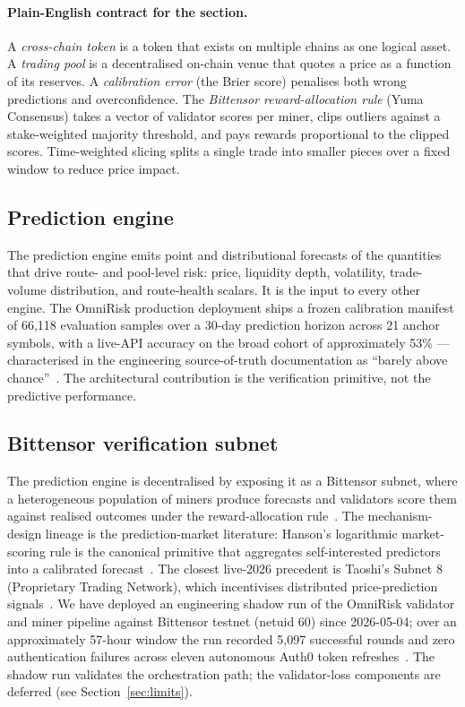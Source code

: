 \documentclass[11pt,a4paper]{article}
\begin{document}
\paragraph{Plain-English contract for the section.} A \emph{cross-chain
token} is a token that exists on multiple chains as one logical asset.
A \emph{trading pool} is a decentralised on-chain venue that quotes a
price as a function of its reserves. A \emph{calibration error} (the
Brier score) penalises both wrong predictions and overconfidence. The
\emph{Bittensor reward-allocation rule} (Yuma Consensus) takes a vector
of validator scores per miner, clips outliers against a stake-weighted
majority threshold, and pays rewards proportional to the clipped scores.
Time-weighted slicing splits a single trade into smaller pieces over a
fixed window to reduce price impact.

\subsection*{Prediction engine}

The prediction engine emits point and distributional forecasts of the
quantities that drive route- and pool-level risk: price, liquidity depth,
volatility, trade-volume distribution, and route-health scalars. It is
the input to every other engine. The OmniRisk production deployment
ships a frozen calibration manifest of 66{,}118 evaluation samples over
a 30-day prediction horizon across 21 anchor symbols, with a live-API
accuracy on the broad cohort of approximately 53\% --- characterised in
the engineering source-of-truth documentation as ``barely above
chance''~\cite{omnirisk2026systemdesign,omnirisk2026calibration}. The
architectural contribution is the verification primitive, not the
predictive performance.

\subsection*{Bittensor verification subnet}

The prediction engine is decentralised by exposing it as a Bittensor
subnet, where a heterogeneous population of miners produce forecasts and
validators score them against realised outcomes under the
reward-allocation rule~\cite{rao2021bittensor,steeves2022incentivizing,
opentensor2024yuma}. The mechanism-design lineage is the prediction-market
literature: Hanson's logarithmic market-scoring rule is the canonical
primitive that aggregates self-interested predictors into a calibrated
forecast~\cite{hanson2003combinatorial}. The closest live-2026
precedent is Taoshi's Subnet 8 (Proprietary Trading Network), which
incentivises distributed price-prediction signals~\cite{taoshi2024ptn}.
We have deployed an engineering shadow run of the OmniRisk validator
and miner pipeline against Bittensor testnet (netuid 60) since
2026-05-04; over an approximately 57-hour window the run recorded
5{,}097 successful rounds and zero authentication failures across
eleven autonomous Auth0 token refreshes~\cite{omnirisk2026soak}. The
shadow run validates the orchestration path; the validator-loss
components are deferred (see Section~\ref{sec:limits}).
\end{document}
